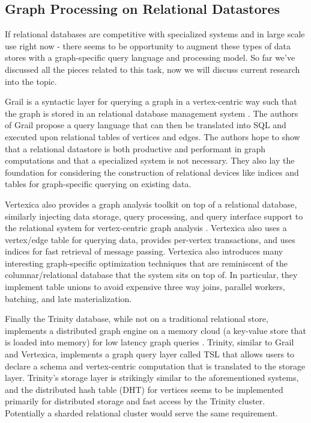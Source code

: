 \documentclass[11pt,letterpaper]{article}
\begin{document}
\subsection*{Graph Processing on Relational Datastores}

If relational databases are competitive with specialized systems and in large scale use right now - there seems to be opportunity to augment these types of data stores with a graph-specific query language and processing model. So far we've discussed all the pieces related to this task, now we will discuss current research into the topic.

Grail is a syntactic layer for querying a graph in a vertex-centric way such that the graph is stored in an relational database management system
\cite{fan_case_2015}. The authors of Grail propose a query language that can then be translated into SQL and executed upon relational tables of vertices and edges. The authors hope to show that a relational datastore is both productive and performant in graph computations and that a specialized system is not necessary. They also lay the foundation for considering the construction of relational devices like indices and tables for graph-specific querying on existing data.

Vertexica also provides a graph analysis toolkit on top of a relational database, similarly injecting data storage, query processing, and query interface support to the relational system for vertex-centric graph analysis \cite{jindal_vertexica:_2014}. Vertexica also uses a vertex/edge table for querying data, provides per-vertex transactions, and uses indices for fast retrieval of message passing. Vertexica also introduces many interesting graph-specific optimization techniques that are reminiscent of the columnar/relational database that the system sits on top of. In particular, they implement table unions to avoid expensive three way joins, parallel workers, batching, and late materialization.

Finally the Trinity database, while not on a traditional relational store, implements a distributed graph engine on a memory cloud (a key-value store that is loaded into memory) for low latency graph queries \cite{shao_trinity:_2013}. Trinity, similar to Grail and Vertexica, implements a graph query layer called TSL that allows users to declare a schema and vertex-centric computation that is translated to the storage layer. Trinity's storage layer is strikingly similar to the aforementioned systems, and the distributed hash table (DHT) for vertices seems to be implemented primarily for distributed storage and fast access by the Trinity cluster. Potentially a sharded relational cluster would serve the same requirement.
\end{document}
